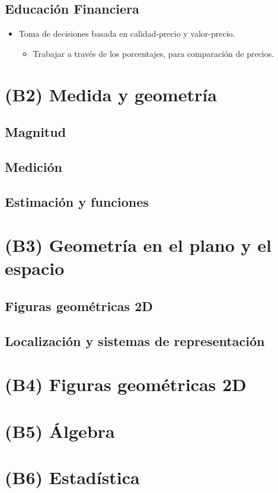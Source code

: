 \subsection*{Educación Financiera}

\begin{itemize}
  \item Toma de decisiones basada en calidad-precio y valor-precio.
  \begin{itemize}
    \item Trabajar a través de los porcentajes, para comparación de precios.
  \end{itemize}
\end{itemize}

\section*{(B2) Medida y geometría}

\subsection*{Magnitud}

\subsection*{Medición}

\subsection*{Estimación y funciones}

\section*{(B3) Geometría en el plano y el espacio}

\subsection*{Figuras geométricas 2D}

\subsection*{Localización y sistemas de representación}

\section*{(B4) Figuras geométricas 2D}

\section*{(B5) Álgebra}

\section*{(B6) Estadística}
